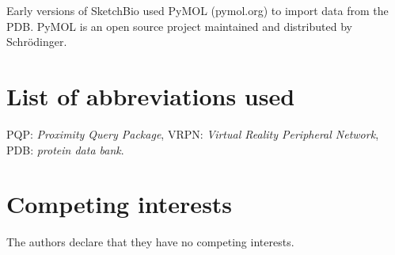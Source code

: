 \documentclass[twocolumn]{bmcart}%
\begin{document}
Early versions of SketchBio used PyMOL (pymol.org) to import data from the PDB.  PyMOL is an open source project maintained and distributed by Schrödinger.


\begin{backmatter}

\section*{List of abbreviations used}
PQP: \textit{Proximity Query Package}, VRPN: \textit{Virtual Reality Peripheral Network}, PDB: \textit{protein data bank}.

\section*{Competing interests}
The authors declare that they have no competing interests.







\end{backmatter}
\end{document}
